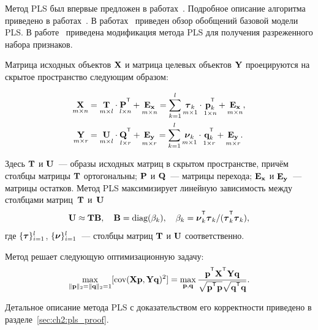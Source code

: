 Метод PLS был впервые предложен в работах~\cite{wold1975path,wold1984collinearity,wold1982pls}. Подробное описание алгоритма приведено в работах~\cite{geladi1986partial,geladi1988notes,de1993simpls,vinzi2010handbook,brereton2014partial}.
В работах~\cite{rosipal2005overview,rosipal2011nonlinear} приведен обзор обобщений базовой модели PLS.
В работе~\cite{chun2010sparse} приведена модификация метода PLS для получения разреженного набора признаков. 
 

Матрица исходных объектов $\mathbf{X}$ и матрица целевых объектов $\mathbf{Y}$ проецируются на скрытое пространство следующим образом:

\begin{align}
	\label{ch1:eq:PLS_X}
	\underset{m \times n}{\bX} 
	&= \underset{m \times l}{\bT} \cdot \underset{l \times n}{\bP^{\T}} + \underset{m \times n}{\bE_{\bx}} 
	= \sum_{k=1}^l \underset{m \times 1}{\btau_k} \cdot \underset{1 \times n}{\bp_k^{\T}} + \underset{m \times n}{\bE_{\bx}},\\
	\label{ch1:eq:PLS_Y}
	\underset{m \times r}{\bY} 
	&= \underset{m \times l}{\bU} \cdot \underset{l \times r}{\bQ^{\T}} + \underset{m \times r}{\bE_{\by}}
	=  \sum_{k=1}^l  \underset{m \times 1}{\bnu_k} \cdot \underset{1 \times r}{\bq_k^{\T}} +  \underset{m \times r}{\bE_{\by}}.
\end{align}

Здесь $\mathbf{T}$ и $\mathbf{U}$~--- образы исходных матриц в скрытом пространстве, причём столбцы матрицы $\mathbf{T}$ ортогональны; $\mathbf{P}$ и $\mathbf{Q}$~--- матрицы перехода; $\mathbf{E}_{\mathbf{x}}$ и $\mathbf{E}_{\mathbf{y}}$~--- матрицы остатков. 
Метод PLS максимизирует линейную зависимость между столбцами матриц~$\mathbf{T}$ и~$\mathbf{U}$
\begin{equation*}
	\bU \approx \bT \bB, \quad \bB = \text{diag}(\beta_k), \quad \beta_k = \bnu_k^{\T}\btau_k / (\btau_k^{\T}\btau_k),
\end{equation*}
где $\{\boldsymbol{\tau}\}_{i=1}^l$, $\{\boldsymbol{\nu}\}_{i=1}^l$~--- столбцы матриц $\mathbf{T}$ и $\mathbf{U}$ соответственно.

Метод решает следующую оптимизационную задачу:
\begin{equation}
	\max_{\|\bp\|_{2}=\|\bq\|_{2}=1}[ \text{cov}(\bX \bp, \bY \bq)^{2}] = \max_{\bp, \bq} \frac{\bp^{\T} \bX^{\T} \bY \bq}{\sqrt{\bp^{\T} \bp} \sqrt{\bq^{\T} \bq}}.
	\label{ch1:eq:pls_max_cov}
\end{equation}

Детальное описание метода PLS с доказательством его корректности приведено в разделе~\ref{sec:ch2:pls_proof}.

